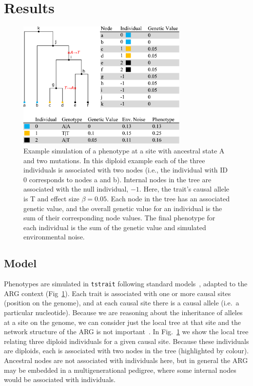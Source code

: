 \documentclass[unnumsec,webpdf,modern,large,namedate]{oup-authoring-template}%
\begin{document}
\section{Results}
\begin{figure}[t]%
\centering
\includegraphics[width=240pt]{figures/tree-illustration.pdf}
\caption{Example simulation of a phenotype at a site with ancestral state A and
two mutations. In this diploid example each of the three individuals
is associated with two nodes (i.e., the individual with ID 0 corresponds
to nodes \textsf{a} and \textsf{b}). Internal nodes in the tree are associated
with the null individual, $-1$. Here, the trait's causal allele is T
and effect size $\beta=0.05$. Each node in the tree has an associated
genetic value, and the overall genetic value for an individual is the
sum of their corresponding node values. The final phenotype
for each individual is the sum of the genetic value and
simulated environmental noise.
\label{fig:tree-illustration}}
\end{figure}

\subsection{Model}
Phenotypes are simulated in \texttt{tstrait} following standard
models~\citep{uffelmann2021}, adapted to the ARG context (Fig~\ref{fig:tree-illustration}).
Each trait is associated with one or more causal sites (position
on the genome), and at each causal site there is a causal allele
(i.e.\ a particular nucleotide). Because we are reasoning
about the inheritance of alleles at a site on the genome,
we can consider just the local tree at that site and
the network structure of the ARG is not important~\citep{wong2023general}.
In Fig.~\ref{fig:tree-illustration} we show the local tree
relating three diploid individuals for a given causal site.
Because these individuals are diploids, each is associated
with two nodes in the tree (highlighted by colour).
Ancestral nodes are not associated with individuals here,
but in general the ARG may be embedded in a multigenerational
pedigree, where some internal nodes would be associated
with individuals.
\end{document}
